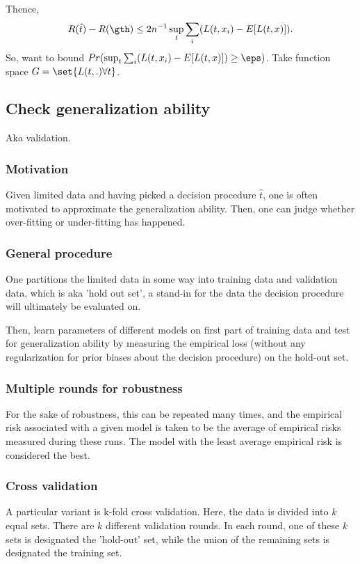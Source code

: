 \documentclass[oneside, article]{memoir}
\begin{document}
Thence, $$R(\hat{t}) - R(\gth) \leq 2n^{-1}\sup_t \sum_i(L(t, x_i) - E[L(t, x)]).$$ So, want to bound $Pr(\sup_t \sum_i(L(t, x_i) - E[L(t, x)]) \geq \eps)$. Take function space $G = \set{L(t,.) \forall t}$.

\subsection{Check generalization ability}
Aka validation.

\subsubsection{Motivation}
Given limited data and having picked a decision procedure $\hat{t}$, one is often motivated to approximate the generalization ability. Then, one can judge whether over-fitting or under-fitting has happened.

\subsubsection{General procedure}
One partitions the limited data in some way into training data and validation data, which is aka 'hold out set', a stand-in for the data the decision procedure will ultimately be evaluated on.

Then, learn parameters of different models on first part of training data and test for generalization ability by measuring the empirical loss (without any regularization for prior biases about the decision procedure) on the hold-out set.

\subsubsection{Multiple rounds for robustness}
For the sake of robustness, this can be repeated many times, and the empirical risk associated with a given model is taken to be the average of empirical risks measured during these runs. The model with the least average empirical risk is considered the best.

\subsubsection{Cross validation}
A particular variant is k-fold cross validation. Here, the data is divided into $k$ equal sets. There are $k$ different validation rounds. In each round, one of these $k$ sets is designated the 'hold-out' set, while the union of the remaining sets is designated the training set.
\end{document}

